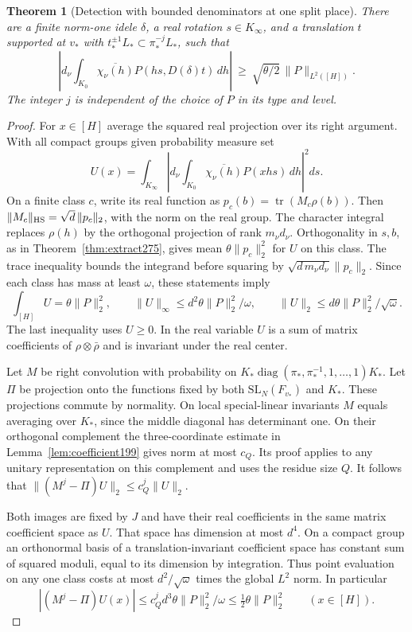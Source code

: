 \documentclass[a4paper,11pt]{article}
\newtheorem{theorem}[proposition]{Theorem}
\theoremstyle{definition}
\theoremstyle{remark}
\numberwithin{equation}{section}
\begin{document}
\begin{theorem}[Detection with bounded denominators at one split place]\leavevmode
\label{thm:mix277}
There are a finite norm-one idele \(\delta\), a real rotation
\(s\in K_\infty\), and a translation \(t\) supported at \(v_*\)
with \(t_*^{\pm1}L_*\subset\pi_*^{-j}L_*\), such that
\[
 \left|d_\nu\int_{K_0}\overline{\chi_\nu(h)}
              P(hs,D(\delta)t)\,dh\right|
       \ \ge\ \sqrt{\theta/2}\,\|P\|_{L^2([H])}.
\]
The integer \(j\) is independent of the choice of \(P\) in its
type and level.
\end{theorem}
\begin{proof}
For \(x\in[H]\) average the squared real projection over
its right argument. With all compact groups given probability
measure set
\[
 U(x)=\int_{K_\infty}
   \left|d_\nu\int_{K_0}\overline{\chi_\nu(h)}P(xhs)\,dh\right|^2ds .
\]
On a finite class \(c\), write its real function as
\(p_c(b)=\operatorname{tr}(M_c\rho(b))\).
Then \(\|M_c\|_{\rm HS}=\sqrt d\,\|p_c\|_2\), with the
norm on the real group. The character integral replaces
\(\rho(h)\) by the orthogonal projection of rank \(m_\nu d_\nu\).
Orthogonality in \(s,b\), as in Theorem~\ref{thm:extract275},
gives mean \(\theta\|p_c\|_2^2\) for \(U\) on this class.
The trace inequality bounds the integrand before squaring by
\(\sqrt{d\,m_\nu d_\nu}\|p_c\|_2\). Since each class has mass
at least \(\omega\), these statements imply
\[
 \int_{[H]}U=\theta\|P\|_2^2,\qquad
 \|U\|_\infty\le d^2\theta\|P\|_2^2/\omega,\qquad
 \|U\|_2\le d\theta\|P\|_2^2/\sqrt{\omega}.
\]
The last inequality uses \(U\ge0\). In the real variable \(U\)
is a sum of matrix coefficients of \(\rho\otimes\bar\rho\)
and is invariant under the real center.

Let \(M\) be right convolution with probability on
\(K_*\operatorname{diag}(\pi_*,\pi_*^{-1},1,\ldots,1)K_*\).
Let \(\Pi\) be projection onto the functions fixed by both
\(\mathrm{SL}_N(F_{v_*})\) and \(K_*\). These projections
commute by normality. On local special-linear invariants \(M\)
equals averaging over \(K_*\), since the middle diagonal has
determinant one. On their orthogonal complement the three-coordinate
estimate in Lemma~\ref{lem:coefficient199} gives norm at most
\(c_Q\). Its proof applies to any unitary representation on this
complement and uses the residue size \(Q\). It follows that
\(\|(M^j-\Pi)U\|_2\le c_Q^j\|U\|_2\).

Both images are fixed by \(J\) and have their real coefficients
in the same matrix coefficient space as \(U\). That space has
dimension at most \(d^4\). On a compact group an orthonormal
basis of a translation-invariant coefficient space has constant
sum of squared moduli, equal to its dimension by integration.
Thus point evaluation on any one class costs at most
\(d^2/\sqrt{\omega}\) times the global \(L^2\) norm. In particular
\[
  |(M^j-\Pi)U(x)|
       \le c_Q^j d^3\theta\|P\|_2^2/\omega
       \le \tfrac12\theta\|P\|_2^2\qquad(x\in[H]).
\]


\end{proof}
\end{document}

